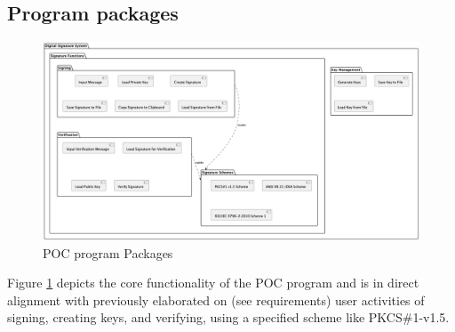 \documentclass[]{final_report}
\theoremstyle{definition}
\begin{document}
\subsection{Program packages}
\begin{figure}[H]
    \centering
    \includegraphics[scale=0.31]{package.png}
    \caption{POC program Packages}
    \label{fig:pack}
\end{figure}
Figure \ref{fig:pack} depicts the core functionality of the POC program and is in direct alignment with previously elaborated on (see requirements) user activities of signing, creating keys, and verifying, using a specified scheme like PKCS\#1-v1.5.
\end{document}
